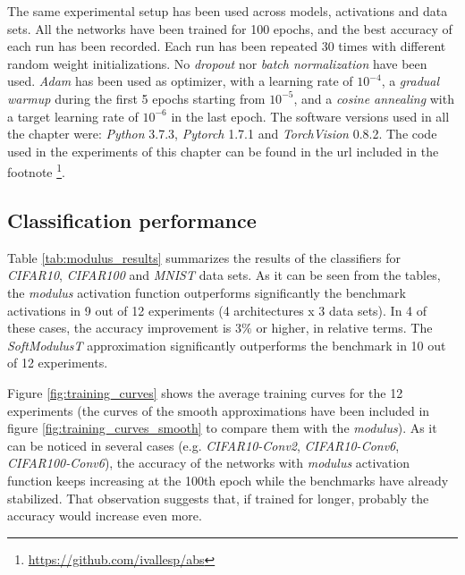 The same experimental setup has been used across models, activations and data sets. All the networks have been trained for 100 epochs, and the best accuracy of each run has been recorded. Each run has been repeated 30 times with different random weight initializations. No \textit{dropout} \autocite{srivastava2014} nor \textit{batch normalization} \autocite{ioffe2015} have been used. \textit{Adam} \autocite{kingma14} has been used as optimizer, with a learning rate of $10^{-4}$, a \textit{gradual warmup} \autocite{gotmare2018} during the first 5 epochs starting from $10^{-5}$, and a \textit{cosine annealing} \autocite{loshchilov2017} with a target learning rate of $10^{-6}$ in the last epoch. The software versions used in all the chapter were: \textit{Python} 3.7.3, \textit{Pytorch} 1.7.1 and  \textit{TorchVision} 0.8.2. The code used in the experiments of this chapter can be found in the url included in the footnote \footnote{\url{https://github.com/ivallesp/abs}}.


\subsection{Classification performance}
Table \ref{tab:modulus_results} summarizes the results of the classifiers for \textit{CIFAR10}, \textit{CIFAR100} and \textit{MNIST} data sets. As it can be seen from the tables, the \textit{modulus} activation function outperforms significantly the benchmark activations in 9 out of 12 experiments (4 architectures x 3 data sets). In 4 of these cases, the accuracy improvement is $3\%$ or higher, in relative terms. The \textit{SoftModulusT} approximation significantly outperforms the benchmark in 10 out of 12 experiments.

Figure \ref{fig:training_curves} shows the average training curves for the 12 experiments (the curves of the smooth approximations have been included in figure \ref{fig:training_curves_smooth} to compare them with the \textit{modulus}). As it can be noticed in several cases (e.g. \textit{CIFAR10-Conv2}, \textit{CIFAR10-Conv6}, \textit{CIFAR100-Conv6}), the accuracy of the networks with \textit{modulus} activation function keeps increasing at the 100th epoch while the benchmarks have already stabilized. That observation suggests that, if trained for longer, probably the accuracy would increase even more.


